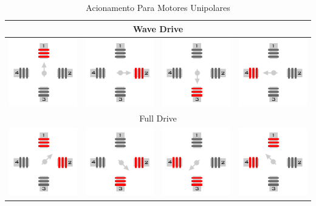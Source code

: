 \begin{table}[H]
	\centering
	\caption{Acionamento Para Motores Unipolares}
	\label{Table:AcionamentoUnipolar}
	\begin{tabular}{|cccc|}
		\hline
		\multicolumn{4}{|c|}{Wave Drive}  \\
		\hline
		\includegraphics[width = 0.15\columnwidth]{Images/AcionamentoDoHSM/Unipolar/WaveDrive/WaveDriveI.png}& \includegraphics[width = 0.15\columnwidth]{Images/AcionamentoDoHSM/Unipolar/WaveDrive/WaveDriveII.png} & \includegraphics[width = 0.15\columnwidth]{Images/AcionamentoDoHSM/Unipolar/WaveDrive/WaveDriveIII.png} & \includegraphics[width = 0.15\columnwidth]{Images/AcionamentoDoHSM/Unipolar/WaveDrive/WaveDriveIV.png} \\
		\hline
		\multicolumn{4}{|c|}{Full Drive}  \\
		\hline
		\includegraphics[width = 0.15\columnwidth]{Images/AcionamentoDoHSM/Unipolar/FullDrive/FullDriveI.png} & \includegraphics[width = 0.15\columnwidth]{Images/AcionamentoDoHSM/Unipolar/FullDrive/FullDriveII.png}   & \includegraphics[width = 0.15\columnwidth]{Images/AcionamentoDoHSM/Unipolar/FullDrive/FullDriveIII.png}   &  \includegraphics[width = 0.15\columnwidth]{Images/AcionamentoDoHSM/Unipolar/FullDrive/FullDriveIV.png}  \\

\end{tabular}
\end{table}
